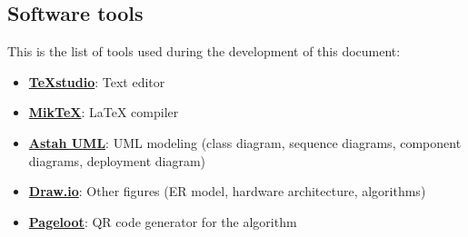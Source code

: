 \subsection{Software tools}
This is the list of tools used during the development of this document:
\begin{itemize}[itemsep=-1mm, topsep=-1mm]
	\item \textbf{\href{https://www.texstudio.org/}{TeXstudio}}: Text editor
	\item \textbf{\href{https://miktex.org/}{MikTeX}}: LaTeX compiler
	\item \textbf{\href{https://astah.net/}{Astah UML}}: UML modeling (class diagram, sequence diagrams, component diagrams, deployment diagram)
	\item \textbf{\href{https://draw.io/}{Draw.io}}: Other figures (ER model, hardware architecture, algorithms)
	\item \textbf{\href{https://pageloot.com/qr-code-generator/}{Pageloot}}: QR code generator for the algorithm
\end{itemize}